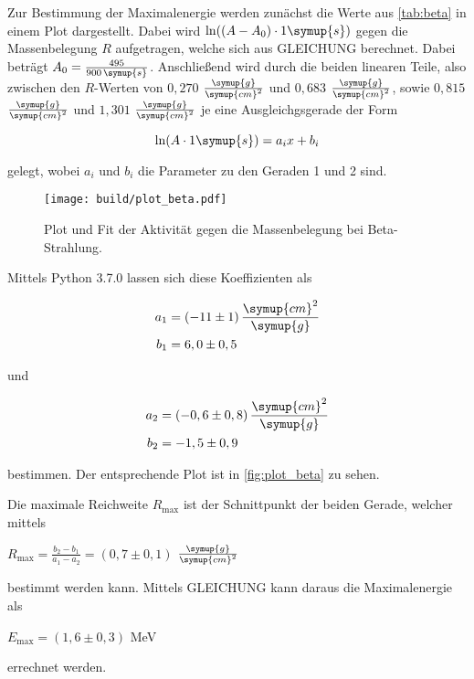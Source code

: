 Zur Bestimmung der Maximalenergie werden zunächst die Werte aus \autoref{tab:beta} in einem Plot dargestellt.
Dabei wird $\ln((A - A_0) \cdot 1 \symup{s})$ gegen die Massenbelegung $R$ aufgetragen, welche sich aus GLEICHUNG berechnet.
Dabei beträgt $A_0 = \frac{495}{900 \, \symup{s}}$.
Anschließend wird durch die beiden linearen Teile,
also zwischen den $R$-Werten von $0,270$ $\frac{\symup{g}}{\symup{cm}^2}$ und $0,683$ $\frac{\symup{g}}{\symup{cm}^2}$, 
sowie $0,815$ $\frac{\symup{g}}{\symup{cm}^2}$ und $1,301$ $\frac{\symup{g}}{\symup{cm}^2}$ je eine Ausgleichgsgerade der Form

\begin{equation}
    \ln(A \cdot 1 \symup{s}) = a_i x + b_i
\end{equation}

gelegt, wobei $a_i$ und $b_i$ die Parameter zu den Geraden 1 und 2 sind.



\begin{figure}
    \centering
    \texttt{[image: build/plot\_beta.pdf]}
    \caption{Plot und Fit der Aktivität gegen die Massenbelegung bei Beta-Strahlung.}
    \label{fig:plot_beta}
\end{figure}

Mittels Python 3.7.0 lassen sich diese Koeffizienten als

\begin{align*}
    a_1 &= (-11 \pm 1) \, \frac{\symup{cm}^2}{\symup{g}}\\
    b_1 &= 6,0 \pm 0,5
\end{align*}

und

\begin{align*}
    a_2 &= (-0,6 \pm 0,8) \, \frac{\symup{cm}^2}{\symup{g}}\\
    b_2 &= -1,5 \pm 0,9
\end{align*}

bestimmen. Der entsprechende Plot ist in \autoref{fig:plot_beta} zu sehen.

Die maximale Reichweite $R_\text{max}$ ist der Schnittpunkt der beiden Gerade, welcher mittels

\begin{center}
    $R_\text{max} = \frac{b_2 - b_1}{a_1 - a_2} = (0,7 \pm 0,1)$ $\frac{\symup{g}}{\symup{cm}^2}$
\end{center}

bestimmt werden kann. Mittels GLEICHUNG kann daraus die Maximalenergie als

\begin{center}
    $E_\text{max} = (1,6 \pm 0,3)$ MeV
\end{center}

errechnet werden.